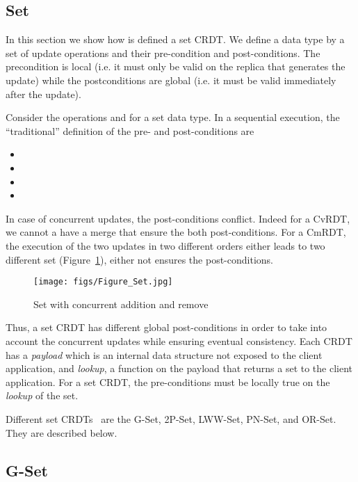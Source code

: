 \documentclass[a4paper]{article}
\begin{document}
\subsection{Set}

In this section we show how is defined a set CRDT.  We define a data
type by a set of update operations and their pre-condition and
post-conditions. The precondition is local (i.e. it must only be valid
on the replica that generates the update) while the postconditions are
global (i.e. it must be valid immediately after the update).


Consider the operations  and  for a set data type. In
a sequential execution, the ``traditional'' definition of the pre- and
post-conditions are
 \begin{itemize}
\item 
\item 
\item    
\item    
\end{itemize}

In case of concurrent updates, the post-conditions 
conflict. Indeed for a CvRDT, we cannot a have a merge that ensure
the both post-conditions. For a CmRDT, the execution of the two
updates in two different orders either leads to two different set
(Figure~\ref{fig:set}), either not ensures the post-conditions.

\begin{figure}[H] 
  \centering
  \texttt{[image: figs/Figure\_Set.jpg]}
  \caption{Set with concurrent addition and remove~\cite{shapiro11comprehensive}}
  \label{fig:set}
\end{figure} 

Thus, a set CRDT has different global post-conditions in order to take
into account the concurrent updates while ensuring eventual
consistency. Each CRDT has a {\em payload} which is an internal data
structure not exposed to the client application, and {\em lookup}, a
function on the payload that returns a set to the client
application. For a set CRDT, the pre-conditions must be locally true
on the {\em lookup} of the set.

Different set CRDTs~\cite{shapiro11comprehensive} are the G-Set,
2P-Set, LWW-Set, PN-Set, and OR-Set. They are described below.

\subsection{G-Set}
\end{document}
